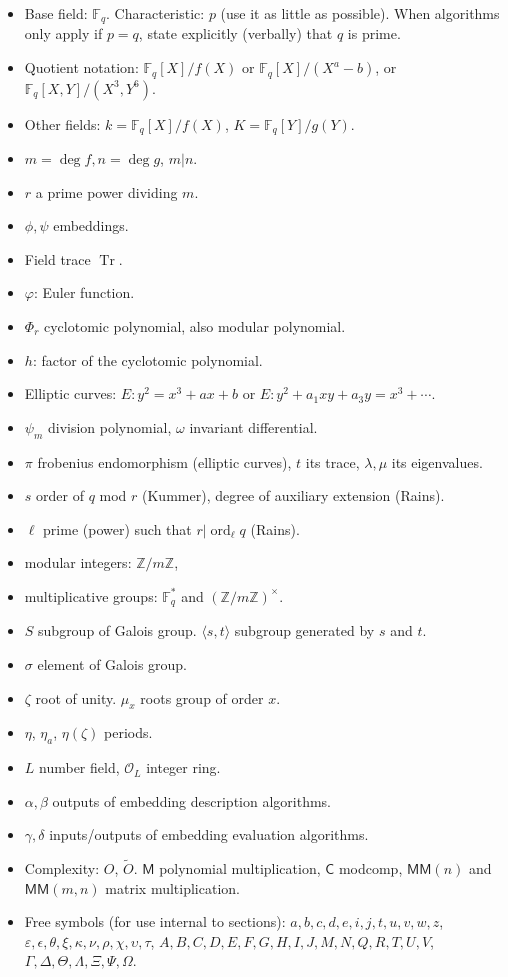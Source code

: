 \documentclass[12pt]{article}
\theoremstyle{plain}
\theoremstyle{definition}
\newcommand{\tildO}{\tilde{O}}
\DeclareMathOperator{\trace}{Tr} %
\DeclareMathOperator{\order}{ord} %
\def\Z{\ensuremath{\mathbb{Z}}}
\def\F{\ensuremath{\mathbb{F}}}
\def\MM{\ensuremath{\mathsf{M}}}
\def\MMM{\ensuremath{\mathsf{MM}}}
\def\CC{\ensuremath{\mathsf{C}}}
\def\euler{\ensuremath{\varphi}}
\newcounter{algorithm}
\begin{document}
\begin{itemize}
\item Base field: $\F_q$. Characteristic: $p$ (use it as little as
  possible). When algorithms only apply if $p=q$, state explicitly
  (verbally) that $q$ is prime.
\item Quotient notation: $\F_q[X]/f(X)$ or $\F_q[X]/(X^a-b)$, or
  $\F_q[X,Y]/(X^3,Y^6)$.
\item Other fields: $k = \F_q[X]/f(X)$, $K = \F_q[Y]/g(Y)$.
\item $m = \deg f, n=\deg g$, $m|n$.
\item $r$ a prime power dividing $m$.
\item $\phi,\psi$ embeddings.
\item Field trace $\trace$.
\item $\euler$: Euler function.
\item $\Phi_r$ cyclotomic polynomial, also modular polynomial.
\item $h$: factor of the cyclotomic polynomial.
\item Elliptic curves: $E:y^2=x^3+ax+b$ or $E:y^2+a_1xy+a_3y=x^3+\cdots$.
\item $\psi_m$ division polynomial, $\omega$ invariant differential.
\item $\pi$ frobenius endomorphism (elliptic curves), $t$ its trace,
  $\lambda,\mu$ its eigenvalues.
\item $s$ order of $q$ mod $r$ (Kummer), degree of auxiliary extension (Rains).
\item $\ell$ prime (power) such that $r|\order_\ell q$ (Rains).
\item modular integers: $\Z/m\Z$,
\item multiplicative groups: $\F_q^\ast$ and $(\Z/m\Z)^\times$.
\item $S$ subgroup of Galois group. $\langle s,t \rangle$ subgroup
  generated by $s$ and $t$.
\item $\sigma$ element of Galois group.
\item $\zeta$ root of unity. $\mu_x$ roots group of order $x$.
\item $\eta$, $\eta_a$, $\eta(\zeta)$ periods.
\item $L$ number field, $\mathcal{O}_L$ integer ring.
\item $\alpha,\beta$ outputs of embedding description algorithms.
\item $\gamma,\delta$ inputs/outputs of embedding evaluation algorithms.
\item Complexity: $O$, $\tildO$. $\MM$ polynomial multiplication,
  $\CC$ modcomp, $\MMM(n)$ and $\MMM(m,n)$ matrix multiplication.
\item Free symbols (for use internal to sections):
  $a,b,c,d,e,i,j,t,u,v,w,z$,
  $\varepsilon,\epsilon,\theta,\xi,\kappa,\nu,\rho,\chi,\upsilon,\tau$,
  $A,B,C,D,E,F,G,H,I,J,M,N,Q,R,T,U,V$,
  $\Gamma,\Delta,\Theta,\Lambda,\Xi,\Psi,\Omega$.
\end{itemize}
\end{document}
